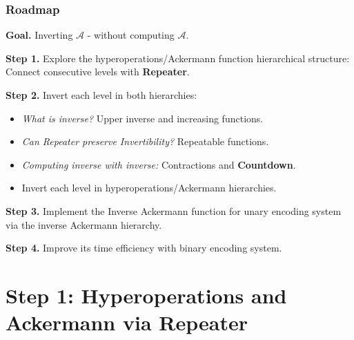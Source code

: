 \documentclass[10pt]{beamer}
\newcommand{\Ack}{\ensuremath{\mathcal{A}}}
\begin{document}
\begin{frame}
\frametitle{Roadmap}


\textbf{Goal.} Inverting $\Ack$ - without computing $\Ack$.

\bigskip

{\textbf{Step 1.} Explore the hyperoperations/Ackermann function hierarchical structure: Connect consecutive levels with \textbf{Repeater}.}

\bigskip

\textbf{Step 2.} Invert each level in both hierarchies:
{ \small
\begin{itemize}\itemsep0em 
	\item \emph{What is inverse?} Upper inverse and increasing functions.
	\item \emph{Can Repeater preserve Invertibility?} Repeatable functions.
	\item \emph{Computing inverse with inverse:} Contractions and \textbf{Countdown}.
	\item Invert each level in hyperoperations/Ackermann hierarchies.
\end{itemize}
}

\bigskip

\textbf{Step 3.} Implement the Inverse Ackermann function for unary encoding system via the inverse Ackermann hierarchy.

\bigskip

\textbf{Step 4.} Improve its time efficiency with binary encoding system.
\end{frame}

\section{Step 1: Hyperoperations and Ackermann via Repeater}
\label{sec: countdown-repeater}

\end{document}
